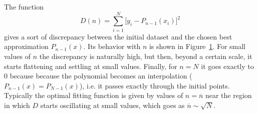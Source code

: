 The function
\begin{equation}
D(n)=\sum_{i=1}^N{\bigl[y_i-P_{n-1}(x_i)\bigr]}^2
\end{equation}
gives a sort of discrepancy between the initial dataset and the chosen best approximation $P_{n-1}(x)$. Its behavior with $n$ is shown in Figure~\ref{Discrepancyn}. For small values of $n$ the discrepancy is naturally high, but then, beyond a certain scale, it starts flattening and settling at small values. Finally, for $n=N$ it goes exactly to 0 because because the polynomial becomes an interpolation ($P_{n-1}(x)=P_{N-1}(x)$), i.e. it passes exactly through the initial points. Typically the optimal fitting function is given by values of $n=\overline{n}$ near the region in which $D$ starts oscillating at small values, which goes as $\overline{n}\sim\sqrt{N}$.
\begin{figure}[h!t]
\centering
\pgfplotsset{set layers}
\caption{}\label{Discrepancyn}
\end{figure}

